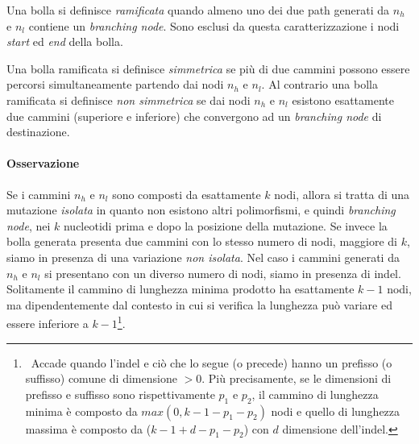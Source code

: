 \documentclass[../main.tex]{subfiles}
\begin{document}
\begin{definition}
Una bolla si definisce \textit{ramificata} quando almeno uno dei due path generati da $n_h$ e $n_l$ contiene un \textit{branching node}. Sono esclusi da questa caratterizzazione i nodi \textit{start} ed \textit{end} della bolla.
\end{definition}

\begin{definition}
Una bolla ramificata si definisce \textit{simmetrica} se più di due cammini possono essere percorsi simultaneamente partendo dai nodi $n_h$ e $n_l$. Al contrario una bolla ramificata si definisce \textit{non simmetrica} se dai nodi $n_h$ e $n_l$ esistono esattamente due cammini (superiore e inferiore) che convergono ad un \textit{branching node} di destinazione.
\end{definition}

\paragraph{Osservazione} Se i cammini $n_h$ e $n_l$ sono composti da esattamente $k$ nodi, allora si tratta di una mutazione \textit{isolata} in quanto non esistono altri polimorfismi, e quindi \textit{branching node}, nei $k$ nucleotidi prima e dopo la posizione della mutazione. Se invece la bolla generata presenta due cammini con lo stesso numero di nodi, maggiore di $k$, siamo in presenza di una variazione \textit{non isolata}. Nel caso i cammini generati da $n_h$ e $n_l$ si presentano con un diverso numero di nodi, siamo in presenza di indel. Solitamente il cammino di lunghezza minima prodotto ha esattamente $k-1$ nodi, ma dipendentemente dal contesto in cui si verifica la lunghezza può variare ed essere inferiore a $k-1$\footnote{\ Accade quando l'indel e ciò che lo segue (o precede) hanno un prefisso (o suffisso) comune di dimensione $> 0$. Più precisamente, se le dimensioni di prefisso e suffisso sono rispettivamente $p_1$ e $p_2$, il cammino di lunghezza minima è composto da $max(0, k-1-p_1 - p_2)$ nodi e quello di lunghezza massima è composto da ($k-1+d-p_1 - p_2$) con $d$ dimensione dell'indel.}.\\
\end{document}
